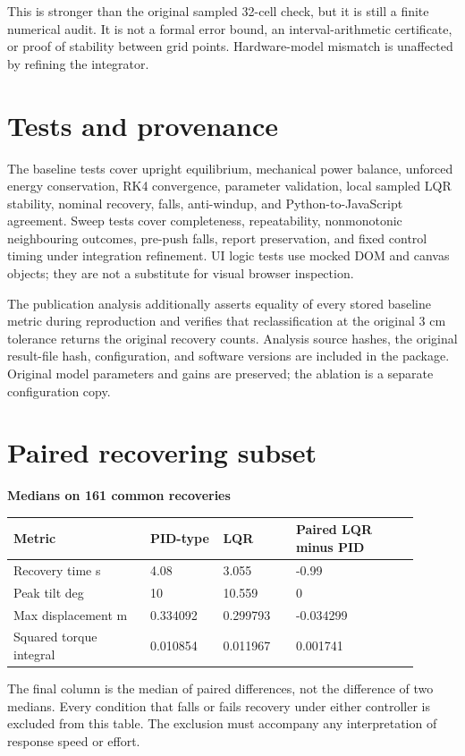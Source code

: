 \documentclass[11pt,a4paper]{article}
\begin{document}
This is stronger than the original sampled 32-cell check, but it is still a finite numerical audit. It is not a formal error bound, an interval-arithmetic certificate, or proof of stability between grid points. Hardware-model mismatch is unaffected by refining the integrator.

\section*{Tests and provenance}
The baseline tests cover upright equilibrium, mechanical power balance, unforced energy conservation, RK4 convergence, parameter validation, local sampled LQR stability, nominal recovery, falls, anti-windup, and Python-to-JavaScript agreement. Sweep tests cover completeness, repeatability, nonmonotonic neighbouring outcomes, pre-push falls, report preservation, and fixed control timing under integration refinement. UI logic tests use mocked DOM and canvas objects; they are not a substitute for visual browser inspection.

The publication analysis additionally asserts equality of every stored baseline metric during reproduction and verifies that reclassification at the original 3 cm tolerance returns the original recovery counts. Analysis source hashes, the original result-file hash, configuration, and software versions are included in the package. Original model parameters and gains are preserved; the ablation is a separate configuration copy.

\section*{Paired recovering subset}
\textbf{Medians on 161 common recoveries}
\begin{longtable}{p{0.306\linewidth}p{0.162\linewidth}p{0.162\linewidth}p{0.27\linewidth}}
\toprule
Metric & PID-type & LQR & Paired LQR minus PID \\ \midrule \endhead
Recovery time s & 4.08 & 3.055 & -0.99 \\
Peak tilt deg & 10 & 10.559 & 0 \\
Max displacement m & 0.334092 & 0.299793 & -0.034299 \\
Squared torque integral & 0.010854 & 0.011967 & 0.001741 \\
\bottomrule
\end{longtable}
The final column is the median of paired differences, not the difference of two medians. Every condition that falls or fails recovery under either controller is excluded from this table. The exclusion must accompany any interpretation of response speed or effort.
\end{document}

